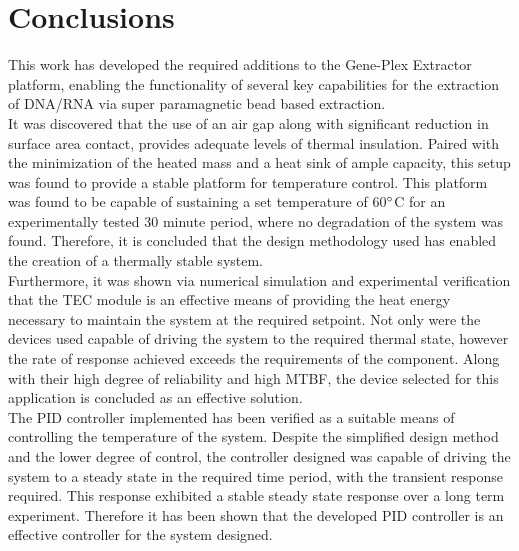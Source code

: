 \chapter{Conclusions}
\label{cha:conclusions}

This work has developed the required additions to the Gene-Plex Extractor platform, enabling the functionality of several key capabilities for the extraction of DNA/RNA via super paramagnetic bead based extraction.\\

It was discovered that the use of an air gap along with significant reduction in surface area contact, provides adequate levels of thermal insulation. Paired with the minimization of the heated mass and a heat sink of ample capacity, this setup was found to provide a stable platform for temperature control. This platform was found to be capable of sustaining a set temperature of 60$\degree$C for an experimentally tested 30 minute period, where no degradation of the system was found. Therefore, it is concluded that the design methodology used has enabled the creation of a thermally stable system.\\

Furthermore, it was shown via numerical simulation and experimental verification that the TEC module is an effective means of providing the heat energy necessary to maintain the system at the required setpoint. Not only were the devices used capable of driving the system to the required thermal state, however the rate of response achieved exceeds the requirements of the component. Along with their high degree of reliability and high MTBF, the device selected for this application is concluded as an effective solution.\\

The PID controller implemented has been verified as a suitable means of controlling the temperature of the system. Despite the simplified design method and the lower degree of control, the controller designed was capable of driving the system to a steady state in the required time period, with the transient response required. This response exhibited a stable steady state response over a long term experiment. Therefore it has been shown that the developed PID controller is an effective controller for the system designed.\\

